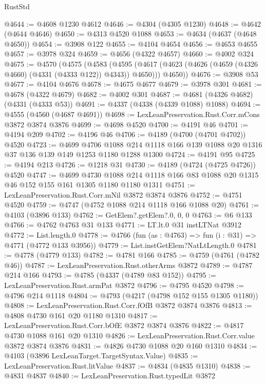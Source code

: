 \begin{lexlean}{RustStd}
\begin{coremodule}
{\begin{coremodule}
{{{{{{{{{{{{{{{{{{{{{{{{{{{{{{{{@4644 := @4608 @1230 @4612
@4646 := @4304 (@4305 @1230)
@4648 := @4642 (@4644 @4646)
@4650 := @4313 @4520 @1088
@4653 := @4634 (@4637 (@4648 @4650))
@4654 := @3908 @122
@4655 := @4104 @4654
@4656 := @4653 @4655
@4657 := @3978 @324
@4659 := @4656 (@4322 @4657)
@4660 := @4002 @324
@4675 := @4570
    (@4575
      (@4583
        (@4595 (@4617 (@4623 (@4626 (@4659 (@4326 @4660) (@4331 (@4333 @122)) @4343)) @4650)))
        @4650))
@4676 := @3908 @53
@4677 := @4104 @4676
@4678 := @4675 @4677
@4679 := @3978 @301
@4681 := @4678 (@4322 @4679)
@4682 := @4002 @301
@4687 := @4681 (@4326 @4682) (@4331 (@4333 @53))
@4691 := @4337 (@4338 (@4339 @1088) @1088)
@4694 := @4555 (@4560 (@4687 @4691))
@4698 := LexLeanPreservation.Rust.Corr.mCons @3872 @3874 @3876
@4699 := @4698 @4520
@4700 := @4191 @46
@4701 := @4194 @209
@4702 := @4196 @46
@4706 := @4189 (@4700 (@4701 @4702)) @4520
@4723 := @4699
    @4706
    @1088
    @214
    @1118
    @166
    @139
    @1088
    @20
    @1316
    @37
    @136
    @139
    @149
    @1253
    @1180
    @1288
    @1300
@4724 := @4191 @95
@4725 := @4194 @213
@4726 := @1218 @31
@4730 := @4189 (@4724 (@4725 @4726)) @4520
@4747 := @4699
    @4730
    @1088
    @214
    @1118
    @166
    @83
    @1088
    @20
    @1315
    @46
    @152
    @155
    @161
    @1305
    @1180
    @1180
    @1311
@4751 := LexLeanPreservation.Rust.Corr.mNil @3872 @3874 @3876
@4752 := @4751 @4520
@4759 := @4747 (@4752 @1088 @214 @1118 @166 @1088 @20)
@4761 := @4103 (@3896 @133)
@4762 := GetElem?.getElem?.{0, 0, 0}
@4763 := @6 @133
@4766 := @4762 @4763 @31 @133
@4771 := LT.lt.{0} @31 instLTNat @3912
@4772 := List.length.{0}
@4778 := @4766 (fun (as : @4763) => fun (i : @31) => @4771 (@4772 @133 @3956))
@4779 := List.instGetElem?NatLtLength.{0}
@4781 := @4778 (@4779 @133)
@4782 := @4781 @166
@4785 := @4759 (@4761 (@4782 @46))
@4787 := LexLeanPreservation.Rust.otherArms @3872
@4789 := @4787 @214 @166
@4793 := @4785 (@4337 (@4789 @83 @152))
@4795 := LexLeanPreservation.Rust.armPat @3872
@4796 := @4795 @4520
@4798 := @4796 @214 @1118
@4804 := @4793 (@4217 (@4798 @152 @155 @1305 @1180))
@4808 := LexLeanPreservation.Rust.Corr.fOfB @3872 @3874 @3876
@4813 := @4808 @4730 @161 @20 @1180 @1310
@4817 := LexLeanPreservation.Rust.Corr.bOfE @3872 @3874 @3876
@4822 := @4817 @4730 @1088 @161 @20 @1310
@4826 := LexLeanPreservation.Rust.Corr.value @3872 @3874 @3876
@4831 := @4826 @4730 @1088 @20 @160 @1310
@4834 := @4103 (@3896 LexLeanTarget.TargetSyntax.Value)
@4835 := LexLeanPreservation.Rust.litValue
@4837 := @4834 (@4835 @1310)
@4838 := @4831 @4837
@4840 := LexLeanPreservation.Rust.typedLit @3872
}}}}}}}}}}}}}}}}}}}}}}}}}}}}}}}}
\end{coremodule}}
\end{coremodule}
\end{lexlean}
